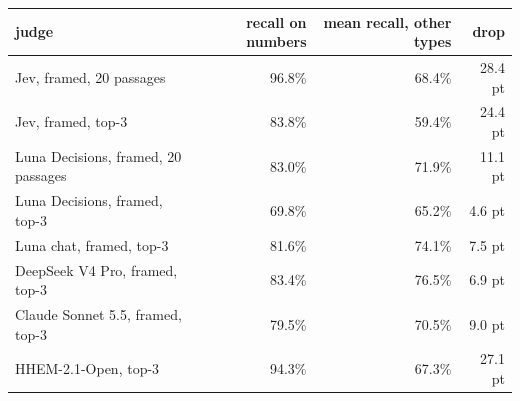 \begin{tabular}{lrrr}
\toprule
judge & recall on numbers & mean recall, other types & drop \\
\midrule
Jev, framed, 20 passages & 96.8\% & 68.4\% & 28.4 pt \\
Jev, framed, top-3 & 83.8\% & 59.4\% & 24.4 pt \\
Luna Decisions, framed, 20 passages & 83.0\% & 71.9\% & 11.1 pt \\
Luna Decisions, framed, top-3 & 69.8\% & 65.2\% & 4.6 pt \\
Luna chat, framed, top-3 & 81.6\% & 74.1\% & 7.5 pt \\
DeepSeek V4 Pro, framed, top-3 & 83.4\% & 76.5\% & 6.9 pt \\
Claude Sonnet 5.5, framed, top-3 & 79.5\% & 70.5\% & 9.0 pt \\
HHEM-2.1-Open, top-3 & 94.3\% & 67.3\% & 27.1 pt \\
\bottomrule
\end{tabular}
